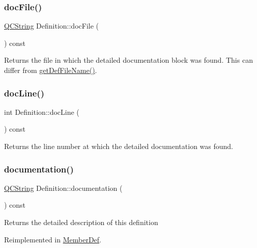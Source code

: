 \subsubsection{\texorpdfstring{docFile()}{docFile()}}
{\footnotesize\ttfamily \mbox{\hyperlink{class_q_c_string}{Q\+C\+String}} Definition\+::doc\+File (\begin{DoxyParamCaption}{ }\end{DoxyParamCaption}) const}

Returns the file in which the detailed documentation block was found. This can differ from \mbox{\hyperlink{class_definition_a9484164b01eca0abce92001b2b77f8c3}{get\+Def\+File\+Name()}}. \mbox{\label{class_definition_a5ecf2e47a19282fbe1dc3413fd73263f}} 
\subsubsection{\texorpdfstring{docLine()}{docLine()}}
{\footnotesize\ttfamily int Definition\+::doc\+Line (\begin{DoxyParamCaption}{ }\end{DoxyParamCaption}) const}

Returns the line number at which the detailed documentation was found. \mbox{\label{class_definition_a4775976f52978089164213f613dbeb18}} 
\subsubsection{\texorpdfstring{documentation()}{documentation()}}
{\footnotesize\ttfamily \mbox{\hyperlink{class_q_c_string}{Q\+C\+String}} Definition\+::documentation (\begin{DoxyParamCaption}{ }\end{DoxyParamCaption}) const\hspace{0.3cm}{\ttfamily [virtual]}}

Returns the detailed description of this definition 

Reimplemented in \mbox{\hyperlink{class_member_def_a0a534c3dba8dced3afa746c535afb59b}{Member\+Def}}.

\mbox{\label{class_definition_a0bd1999f66045c290a4b32e3cb8f8e6b}} 
